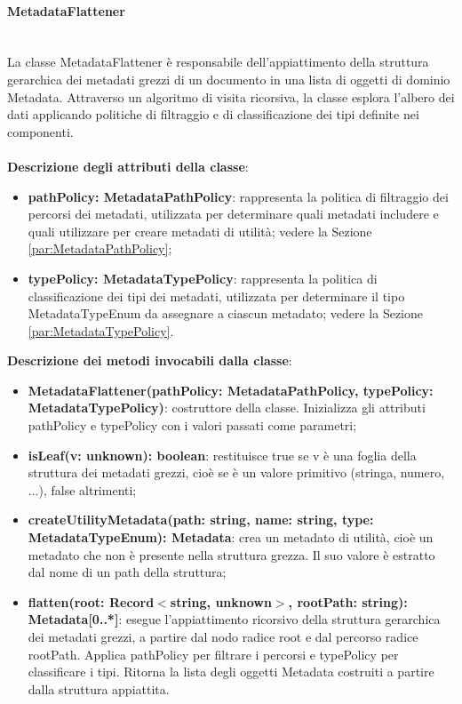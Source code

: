 \documentclass[a4paper,12pt]{article}
\begin{document}
{{{                \paragraph{MetadataFlattener}\label{par:MetadataFlattener}\mbox{}\\
                La classe MetadataFlattener è responsabile dell'appiattimento della struttura gerarchica dei metadati grezzi di un documento in una lista di oggetti di dominio Metadata. Attraverso un algoritmo di visita ricorsiva, la classe esplora l'albero dei dati applicando politiche di filtraggio e di classificazione dei tipi definite nei componenti. \\
                \\
                \textbf{Descrizione degli attributi della classe}:
                \begin{itemize}
                    \item \textbf{pathPolicy: MetadataPathPolicy}: rappresenta la politica di filtraggio dei percorsi dei metadati, utilizzata per determinare quali metadati includere e quali utilizzare per creare metadati di utilità; vedere la Sezione \ref{par:MetadataPathPolicy};
                    \item \textbf{typePolicy: MetadataTypePolicy}: rappresenta la politica di classificazione dei tipi dei metadati, utilizzata per determinare il tipo MetadataTypeEnum da assegnare a ciascun metadato; vedere la Sezione \ref{par:MetadataTypePolicy}.
                \end{itemize}
 
                \noindent \textbf{Descrizione dei metodi invocabili dalla classe}:
                \begin{itemize}
                    \item \textbf{MetadataFlattener(pathPolicy: MetadataPathPolicy, typePolicy: MetadataTypePolicy)}: costruttore della classe. Inizializza gli attributi pathPolicy e typePolicy con i valori passati come parametri;
                    \item \textbf{isLeaf(v: unknown): boolean}: restituisce true se v è una foglia della struttura dei metadati grezzi, cioè se è un valore primitivo (stringa, numero, ...), false altrimenti;
                    \item \textbf{createUtilityMetadata(path: string, name: string, type: MetadataTypeEnum): Metadata}: crea un metadato di utilità, cioè un metadato che non è presente nella struttura grezza. Il suo valore è estratto dal nome di un path della struttura;
                    \item \textbf{flatten(root: Record$<$string, unknown$>$, rootPath: string): Metadata[0..*]}: esegue l'appiattimento ricorsivo della struttura gerarchica dei metadati grezzi, a partire dal nodo radice root e dal percorso radice rootPath. Applica pathPolicy per filtrare i percorsi e typePolicy per classificare i tipi. Ritorna la lista degli oggetti Metadata costruiti a partire dalla struttura appiattita.
                \end{itemize}

}}}
\end{document}
